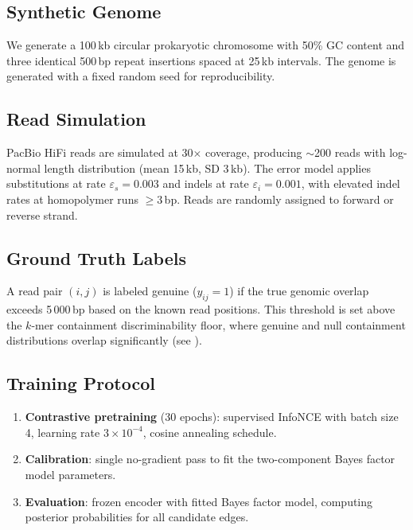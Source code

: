 \documentclass[11pt,a4paper]{article}
\begin{document}
\subsection{Synthetic Genome}

We generate a 100\,kb circular prokaryotic chromosome with 50\% GC
content and three identical 500\,bp repeat insertions spaced at 25\,kb
intervals.  The genome is generated with a fixed random seed for
reproducibility.

\subsection{Read Simulation}

PacBio HiFi reads are simulated at 30$\times$ coverage, producing
$\sim$200 reads with log-normal length distribution (mean 15\,kb,
SD 3\,kb).  The error model applies substitutions at rate $\varepsilon_s
= 0.003$ and indels at rate $\varepsilon_i = 0.001$, with elevated
indel rates at homopolymer runs $\geq 3$\,bp.  Reads are randomly
assigned to forward or reverse strand.

\subsection{Ground Truth Labels}

A read pair $(i,j)$ is labeled genuine ($y_{ij} = 1$) if the true
genomic overlap exceeds 5\,000\,bp based on the known read positions.
This threshold is set above the $k$-mer containment discriminability
floor, where genuine and null containment distributions overlap
significantly (see ).

\subsection{Training Protocol}

\begin{enumerate}
  \item \textbf{Contrastive pretraining} (30 epochs): supervised
    InfoNCE with batch size 4, learning rate $3 \times 10^{-4}$,
    cosine annealing schedule.
  \item \textbf{Calibration}: single no-gradient pass to fit the
    two-component Bayes factor model parameters.
  \item \textbf{Evaluation}: frozen encoder with fitted Bayes factor
    model, computing posterior probabilities for all candidate edges.
\end{enumerate}
\end{document}
